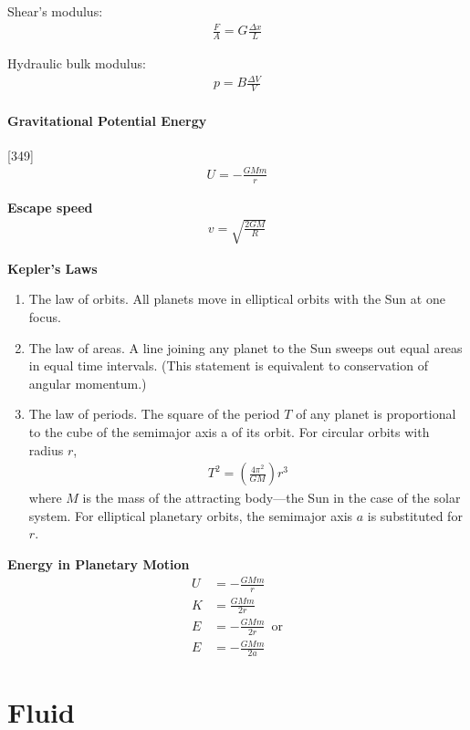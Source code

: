 \documentclass{article}
\numberwithin{equation}{subsection} %
\theoremstyle{definition}
\begin{document}
Shear's modulus:
\begin{align}
    \frac{F}{A} = G \frac{\Delta x}{L}
\end{align}

Hydraulic bulk modulus:
\begin{align}
    p = B \frac{\Delta V}{V}
\end{align}

\paragraph{Gravitational Potential Energy} [349]
\begin{align}
    U = -\frac{GMm}{r}
\end{align}

\textbf{Escape speed}
\begin{align}
    v = \sqrt{ \frac{2GM}{R} }
\end{align}

\textbf{Kepler's Laws}
\begin{enumerate}
    \item The law of orbits. All planets move in elliptical orbits
        with the Sun at one focus.
    \item The law of areas. A line joining any planet to the Sun
        sweeps out equal areas in equal time intervals. (This
        statement is equivalent to conservation of angular momentum.)
    \item The law of periods. The square of the period $T$ of any
        planet is proportional to the cube of the semimajor axis a of
        its orbit. For circular orbits with radius $r$,
    \begin{align}
        T^2 = \left(\frac{4\pi^2}{GM}\right) r^3
    \end{align}
        where $M$ is the mass of the attracting body—the Sun in the
        case of the solar system. For elliptical planetary orbits, the
        semimajor axis $a$ is substituted for $r$.
\end{enumerate}

\textbf{Energy in Planetary Motion}
\begin{align}
    U &= -\frac{GMm}{r} \\
    K &= \frac{GMm}{2r} \\
    E &= -\frac{GMm}{2r} \,\text{ or} \\
    E &= -\frac{GMm}{2a} 
\end{align}

\section{Fluid}
\label{sec:Fluid}
\end{document}
